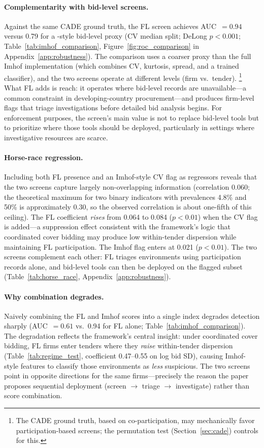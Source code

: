 \paragraph{Complementarity with bid-level screens.}
Against the same CADE ground truth, the FL screen achieves
AUC~$= 0.94$ versus 0.79 for a \citet{imhof2019detecting}-style
bid-level proxy (CV median split; DeLong $p < 0.001$;
Table~\ref{tab:imhof_comparison},
Figure~\ref{fig:roc_comparison} in Appendix~\ref{app:robustness}).
The comparison uses a coarser proxy than the full Imhof
implementation (which combines CV, kurtosis, spread, and a trained
classifier), and the two screens operate at different levels (firm
vs.\ tender).%
\footnote{The CADE ground truth, based on co-participation, may
mechanically favor participation-based screens; the permutation test
(Section~\ref{sec:cade}) controls for this.}
What FL adds is reach: it operates where bid-level records are
unavailable---a common constraint in developing-country
procurement---and produces firm-level flags that triage
investigations before detailed bid analysis begins. For enforcement
purposes, the screen's main value is not to replace bid-level tools
but to prioritize where those tools should be deployed, particularly
in settings where investigative resources are scarce.

\paragraph{Horse-race regression.}
Including both FL presence and an Imhof-style CV flag as regressors
reveals that the two screens capture largely non-overlapping
information (correlation 0.060; the theoretical maximum for two
binary indicators with prevalences 4.8\% and 50\% is approximately
0.30, so the observed correlation is about one-fifth of this
ceiling). The FL coefficient \emph{rises} from 0.064 to
0.084 ($p < 0.01$) when the CV flag is added---a suppression effect
consistent with the framework's logic that coordinated cover bidding
may produce low within-tender dispersion while maintaining FL
participation. The Imhof flag enters at 0.021 ($p < 0.01$). The two
screens complement each other: FL triages environments using
participation records alone, and bid-level tools can then be deployed
on the flagged subset (Table~\ref{tab:horse_race},
Appendix~\ref{app:robustness}).

\paragraph{Why combination degrades.}
Naively combining the FL and Imhof scores into a single index
degrades detection sharply (AUC~$= 0.61$ vs.\ 0.94 for FL alone;
Table~\ref{tab:imhof_comparison}). The degradation reflects the
framework's central insight: under coordinated cover bidding, FL
firms enter tenders where they \emph{raise} within-tender dispersion
(Table~\ref{tab:regime_test}, coefficient 0.47--0.55 on log bid SD),
causing Imhof-style features to classify those environments as
\emph{less} suspicious. The two screens point in opposite directions
for the same firms---precisely the reason the paper proposes
sequential deployment (screen $\to$ triage $\to$ investigate) rather
than score combination.

